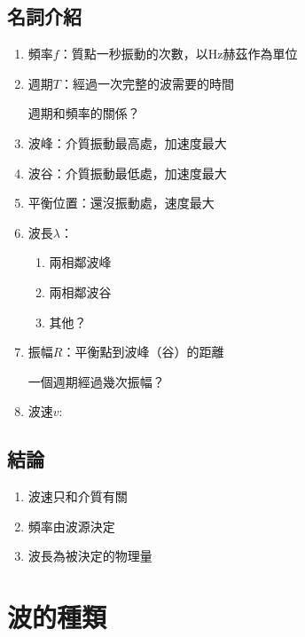 \documentclass[cn,10pt,math=newtx,chinesefont=founder]{elegantbook}
\begin{document}
\subsection{名詞介紹}
\begin{enumerate}
    \item 頻率$f$：質點一秒振動的次數，以Hz赫茲作為單位
    \item 週期$T$：經過一次完整的波需要的時間
    \begin{note}{週期和頻率的關係？}
        \\
    \end{note}
    \item 波峰：介質振動最高處，加速度最大
    \item 波谷：介質振動最低處，加速度最大
    \item 平衡位置：還沒振動處，速度最大
    \item 波長$\lambda$：
    \begin{enumerate}
        \item 兩相鄰波峰
        \item 兩相鄰波谷
        \item 其他？
    \end{enumerate}
    \item 振幅$R$：平衡點到波峰（谷）的距離
    \begin{note}{一個週期經過幾次振幅？}
        \\
    \end{note}
    \item 波速$v$:\\
    
\end{enumerate}
\newpage

\subsection{結論}
\begin{enumerate}
    \item 波速只和介質有關
    \item 頻率由波源決定
    \item 波長為被決定的物理量
\end{enumerate}

\section{波的種類}
\end{document}
